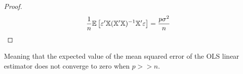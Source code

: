 \begin{proof}
\begin{align*}
\frac{1}{n} \mathbb{E}\left[
    \varepsilon'\mathbb{X}(\mathbb{X}'\mathbb{X})^{-1}\mathbb{X}'\varepsilon
\right]
&= \frac{p\sigma^2}{n}\\
\end{align*}

\end{proof}

Meaning that the expected value of the mean squared error of the OLS linear estimator does not converge to zero when $p >> n$.